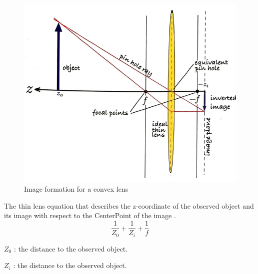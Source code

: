 \documentclass[journal,final,a4paper,twoside]{PS}
\begin{document}
\begin{figure}[h]
\begin{center}
\includegraphics[scale=0.6]{./pics/imageFormationGeometry.png}
\caption{Image formation for a convex lens \cite{Corke}}
\label{fig:imageGeometry}
\end{center}
\end{figure}
The thin lens equation that describes the z-coordinate of the observed object and its image with respect to the CenterPoint of the image \cite{Corke}.
\begin{equation}
\frac{1}{Z_0}+\frac{1}{Z_i}+\frac{1}{f}
\end{equation}



$Z_0$ : the distance to the observed object.

$Z_i$ : the distance to the observed object.
\end{document}

